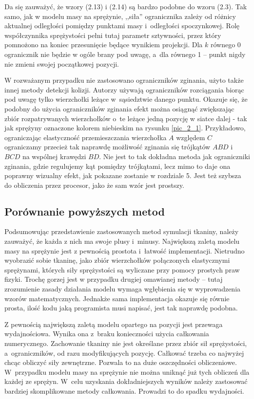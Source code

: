 			Da się zauważyć, że wzory (2.13) i (2.14) są bardzo podobne do wzoru (2.3). Tak samo, jak w modelu masy na sprężynie, ,,siła'' ogranicznika zależy od różnicy aktualnej odległości pomiędzy punktami masy i~odległości spoczynkowej. Rolę współczynnika sprężystości pełni tutaj parametr sztywności, przez który pomnożono na koniec przesunięcie będące wynikiem projekcji. Dla \(k\) równego 0 ogranicznik nie będzie w ogóle brany pod uwagę, a~dla równego 1 -- punkt nigdy nie zmieni swojej początkowej pozycji.
			
			W rozważanym przypadku nie zastosowano ograniczników zginania, użyto także innej metody detekcji kolizji. Autorzy \cite{posbased} używają ograniczników rozciągania biorąc pod uwagę tylko wierzchołki leżące w~sąsiedztwie danego punktu. Okazuje się, że podobny do użycia ograniczników zginania efekt można osiągnąć zwiększając zbiór rozpatrywanych wierzchołków o~te leżące jedną pozycję w siatce dalej - tak jak sprężyny oznaczone kolorem niebieskim na rysunku \ref{pic_2_1}. Przykładowo, ograniczając elastyczność przemieszczania wierzchołka \(A\) względem \(C\) ograniczamy przecież tak naprawdę możliwość zginania się trójkątów \(ABD\) i~\(BCD\) na wspólnej krawędzi \(BD\). Nie jest to tak dokładna metoda jak ograniczniki zginania, gdzie regulujemy kąt pomiędzy trójkątami, lecz mimo to daje ona poprawny wizualny efekt, jak pokazane zostanie w rozdziale 5. Jest też szybsza do obliczenia przez procesor, jako że sam wzór jest prostszy.
		
		\subsection{Porównanie powyższych metod}
		\label{t:teoria:analiza:porownanie}
		
			Podsumowując przedstawienie zastosowanych metod symulacji tkaniny, należy zauważyć, że każda z nich ma swoje plusy i~minusy. Największą zaletą modelu masy na sprężynie jest z pewnością prostota i~łatwość implementacji. Nietrudno wyobrazić sobie tkaninę, jako zbiór wierzchołków połączonych elastycznymi sprężynami, których siły sprężystości są wyliczane przy pomocy prostych praw fizyki. Trochę gorzej jest w przypadku drugiej omawianej metody -- tutaj zrozumienie zasady działania modelu wymaga wgłębienia się w wyprowadzenia wzorów matematycznych. Jednakże sama implementacja okazuje się równie prosta, ilość kodu jaką programista musi napisać, jest tak naprawdę podobna.
			
			Z pewnością największą zaletą modelu opartego na pozycji jest przewaga wydajnościowa. Wynika ona z~braku konieczności użycia całkowania numerycznego. Zachowanie tkaniny nie jest określane przez zbiór sił sprężystości, a~ograniczników, od razu modyfikujących pozycję. Całkować trzeba co najwyżej chcąc obliczyć siły zewnętrzne. Pozwala to na duże oszczędności obliczeniowe. W~przypadku modelu masy na sprężynie nie można uniknąć już tych obliczeń dla każdej ze sprężyn. W~celu uzyskania dokładniejszych wyników należy zastosować bardziej skomplikowane metody całkowania. Prowadzi to do spadku wydajności.
			
